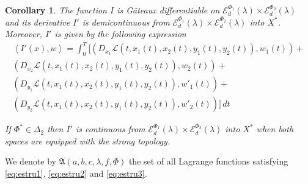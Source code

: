 \documentclass[twoside]{article}
\newtheorem{cor}[thm]{Corollary}
\theoremstyle{remark}
\newcommand{\domiuno}{\mathcal{E}^{\Phi_1}_d(\lambda)}
\newcommand{\domidos}{\mathcal{E}^{\Phi_2}_d(\lambda)}
\newcommand{\Phie}{\Phi^{*}}
\begin{document}
\begin{cor}
The function  $I$ is G\^ateaux differentiable on $\domiuno\times \domidos$ and  its derivative $I'$ is demicontinuous from $\domiuno\times\domidos$  into $X^*$. Moreover, $I'$ is given by the following expression
\begin{equation}\label{DerAccion}
\begin{split}
\left\langle I'(x),w \right\rangle=\int_0^T 
[
(D_{x_1}\mathcal{L}(t,x_1(t),x_2(t),y_1(t),y_2(t)),w_1(t))+
\\
(D_{x_2}\mathcal{L}(t,x_1(t),x_2(t),y_1(t),y_2(t)),w_2(t))+
\\
(D_{y_1}\mathcal{L}(t,x_1(t),x_2(t),y_1(t),y_2(t)),w'_1(t))+
\\
(D_{y_2}\mathcal{L}(t,x_1(t),x_2(t),y_1(t),y_2(t)),w'_2(t))
]\,dt
\end{split}
\end{equation}

If  $\Phie \in \Delta_2$ then
  $I'$ is continuous from $\domiuno\times\domidos$ into $X^*$ when both spaces are equipped with the strong topology.
\end{cor}


We denote by $\mathfrak{A}(a,b,c,\lambda,f,\Phi)$ the set of all Lagrange functions satisfying  \eqref{eq:estru1}, \eqref{eq:estru2} and \eqref{eq:estru3}.
\end{document}
